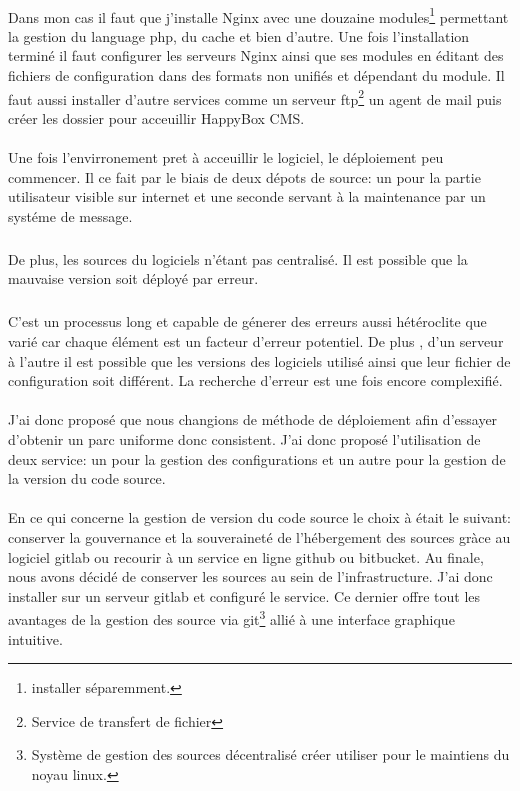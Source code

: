 \documentclass[11pt, a4paper ]{article}
\begin{document}
\begin{spacing}{1.5}
\paragraph{}
Dans mon cas il faut que j'installe Nginx avec une douzaine modules\footnote{installer séparemment.} permettant la gestion du language php, du cache et bien d'autre. Une fois l'installation terminé il faut configurer les serveurs Nginx ainsi que ses modules en éditant des fichiers de configuration dans des formats non unifiés et dépendant du module. Il faut aussi installer d'autre services comme un serveur ftp\footnote{Service de transfert de fichier} un agent de mail puis créer les dossier pour acceuillir HappyBox CMS. 
\paragraph{}
Une fois l'envirronement pret à acceuillir le logiciel, le déploiement peu commencer. Il ce fait par le biais de deux dépots de source: un pour la partie utilisateur visible sur internet et une seconde servant à la maintenance par un systéme de message. 
\subparagraph{}
De plus, les sources du logiciels n'étant pas centralisé. Il est possible que la mauvaise version soit déployé par erreur.   
\subparagraph{}
C'est un processus long et capable de génerer des erreurs aussi hétéroclite que varié car chaque élément est un facteur d'erreur potentiel. De plus , d'un serveur à l'autre il est possible que les versions des logiciels utilisé ainsi que leur fichier de configuration soit différent. La recherche d'erreur est une fois encore complexifié.
\paragraph{}
J'ai donc proposé que nous changions de méthode de déploiement afin d'essayer d'obtenir un parc uniforme donc consistent. J'ai donc proposé l'utilisation de deux service: un pour la gestion des configurations et un autre pour la gestion de la version du code source.  
\paragraph{}
En ce qui concerne la gestion de version du code source le choix à était le suivant: conserver la gouvernance et la souveraineté de l'hébergement des sources gràce au logiciel gitlab ou recourir à un service en ligne github ou bitbucket. Au finale, nous avons décidé de conserver les sources au sein de l'infrastructure. J'ai donc installer sur un serveur gitlab et configuré le service. Ce dernier offre tout les avantages de la gestion des source via git\footnote{Système de gestion des sources décentralisé créer utiliser pour le maintiens du noyau linux.} allié à une interface graphique intuitive.

\end{spacing}
\end{document}
